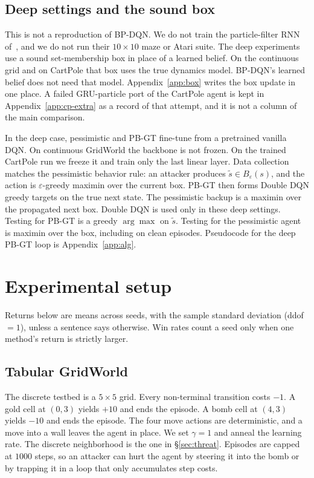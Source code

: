 \documentclass[10pt,twocolumn]{article}
\begin{document}
\subsection{Deep settings and the sound box}
\label{sec:deep}

This is not a reproduction of BP-DQN.
We do not train the particle-filter RNN of~\cite{sun2024belief}, and we do not run their $10{\times}10$ maze or Atari suite.
The deep experiments use a sound set-membership box in place of a learned belief.
On the continuous grid and on CartPole that box uses the true dynamics model.
BP-DQN's learned belief does not need that model.
Appendix~\ref{app:box} writes the box update in one place.
A failed GRU-particle port of the CartPole agent is kept in Appendix~\ref{app:cp-extra} as a record of that attempt, and it is not a column of the main comparison.

In the deep case, pessimistic and PB-GT fine-tune from a pretrained vanilla DQN.
On continuous GridWorld the backbone is not frozen.
On the trained CartPole run we freeze it and train only the last linear layer.
Data collection matches the pessimistic behavior rule: an attacker produces $\tilde s\in B_\varepsilon(s)$, and the action is $\varepsilon$-greedy maximin over the current box.
PB-GT then forms Double DQN greedy targets on the true next state.
The pessimistic backup is a maximin over the propagated next box.
Double DQN is used only in these deep settings.
Testing for PB-GT is a greedy $\arg\max$ on $\tilde s$.
Testing for the pessimistic agent is maximin over the box, including on clean episodes.
Pseudocode for the deep PB-GT loop is Appendix~\ref{app:alg}.

\section{Experimental setup}
\label{sec:setup}

Returns below are means across seeds, with the sample standard deviation (ddof${=}1$), unless a sentence says otherwise.
Win rates count a seed only when one method's return is strictly larger.

\subsection{Tabular GridWorld}
\label{sec:gw-setup}

The discrete testbed is a $5{\times}5$ grid.
Every non-terminal transition costs $-1$.
A gold cell at $(0,3)$ yields $+10$ and ends the episode.
A bomb cell at $(4,3)$ yields $-10$ and ends the episode.
The four move actions are deterministic, and a move into a wall leaves the agent in place.
We set $\gamma=1$ and anneal the learning rate.
The discrete neighborhood is the one in \S\ref{sec:threat}.
Episodes are capped at $1000$ steps, so an attacker can hurt the agent by steering it into the bomb or by trapping it in a loop that only accumulates step costs.
\end{document}
